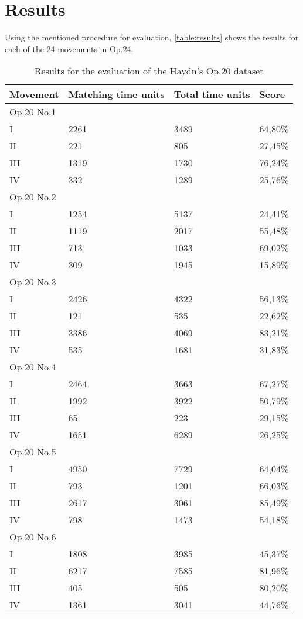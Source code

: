 \chapter{Results}
\label{chap:results}

Using the mentioned procedure for evaluation, \autoref{table:results} shows the results for each of the 24 movements in Op.24.

\begin{table}[]
\centering
\begin{tabular}{|l|l|l|l|}
\hline
Movement & Matching time units & Total time units & Score \\ \hline
\multicolumn{4}{|l|}{Op.20 No.1} \\ \hline
I & 2261 & 3489 & 64,80\% \\ \hline
II & 221 & 805 & 27,45\% \\ \hline
III & 1319 & 1730 & 76,24\% \\ \hline
IV & 332 & 1289 & 25,76\% \\ \hline
\multicolumn{4}{|l|}{Op.20 No.2} \\ \hline
I & 1254 & 5137 & 24,41\% \\ \hline
II & 1119 & 2017 & 55,48\% \\ \hline
III & 713 & 1033 & 69,02\% \\ \hline
IV & 309 & 1945 & 15,89\% \\ \hline
\multicolumn{4}{|l|}{Op.20 No.3} \\ \hline
I & 2426 & 4322 & 56,13\% \\ \hline
II & 121 & 535 & 22,62\% \\ \hline
III & 3386 & 4069 & 83,21\% \\ \hline
IV & 535 & 1681 & 31,83\% \\ \hline
\multicolumn{4}{|l|}{Op.20 No.4} \\ \hline
I & 2464 & 3663 & 67,27\% \\ \hline
II & 1992 & 3922 & 50,79\% \\ \hline
III & 65 & 223 & 29,15\% \\ \hline
IV & 1651 & 6289 & 26,25\% \\ \hline
\multicolumn{4}{|l|}{Op.20 No.5} \\ \hline
I & 4950 & 7729 & 64,04\% \\ \hline
II & 793 & 1201 & 66,03\% \\ \hline
III & 2617 & 3061 & 85,49\% \\ \hline
IV & 798 & 1473 & 54,18\% \\ \hline
\multicolumn{4}{|l|}{Op.20 No.6} \\ \hline
I & 1808 & 3985 & 45,37\% \\ \hline
II & 6217 & 7585 & 81,96\% \\ \hline
III & 405 & 505 & 80,20\% \\ \hline
IV & 1361 & 3041 & 44,76\% \\ \hline
\end{tabular}
\caption{Results for the evaluation of the Haydn's Op.20 dataset}
\label{table:results}
\end{table}

